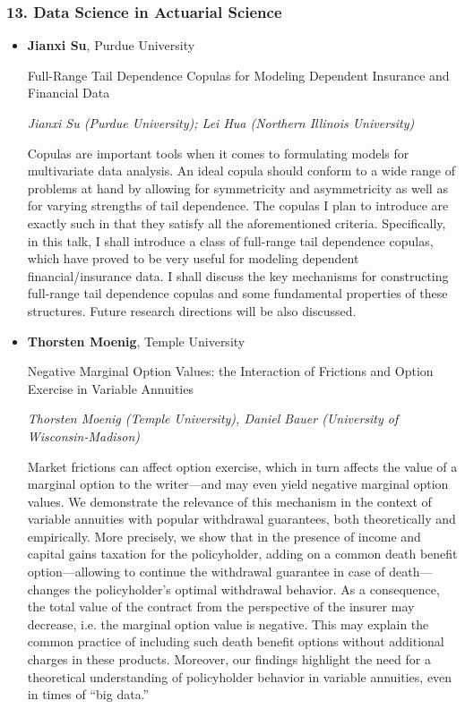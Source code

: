 \subsubsection*{13. Data Science in Actuarial Science}

\begin{itemize}
\item \textbf{Jianxi Su}, Purdue University

Full-Range Tail Dependence Copulas for Modeling Dependent Insurance and Financial Data

\emph{\footnotesize Jianxi Su (Purdue University); Lei Hua (Northern Illinois University)}

Copulas are important tools when it comes to formulating models for multivariate data analysis.  An ideal copula should conform to a wide range of problems at hand by allowing for symmetricity and asymmetricity as well as for varying strengths of tail dependence. The copulas I plan to introduce are exactly such in that they satisfy all the aforementioned criteria. Specifically, in this talk, I shall introduce a class of full-range tail dependence copulas, which have proved to be very useful for modeling dependent financial/insurance data. I shall discuss the key mechanisms for constructing full-range tail dependence copulas and some fundamental properties of these structures.  Future research directions will be also discussed. 


\item \textbf{Thorsten Moenig}, Temple University

Negative Marginal Option Values:  the Interaction of Frictions and Option Exercise in Variable Annuities

\emph{\footnotesize Thorsten Moenig (Temple University), Daniel Bauer (University of Wisconsin-Madison)}

Market frictions can affect option exercise, which in turn affects the value of a marginal option to the writer---and may even yield negative marginal option values.  We demonstrate the relevance of this mechanism in the context of variable annuities with popular withdrawal guarantees, both theoretically and empirically.  More precisely, we show that in the presence of income and capital gains taxation for the policyholder, adding on a common death benefit option---allowing to continue the withdrawal guarantee in case of death---changes the policyholder's optimal withdrawal behavior.  As a consequence, the total value of the contract from the perspective of the insurer may decrease, i.e. the marginal option value is negative.  This may explain the common practice of including such death benefit options without additional charges in these products.  Moreover, our findings highlight the need for a theoretical understanding of policyholder behavior in variable annuities, even in times of ``big data.''


\end{itemize}
